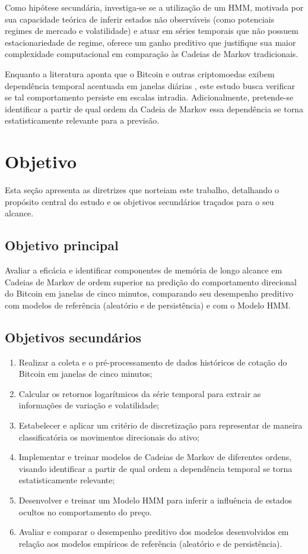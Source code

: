 \documentclass[
    12pt,                %
    openright,           %
    oneside,             %
    a4paper,             %
    english,             %
    brazil               %
]{abntex2}
\begin{document}
Como hipótese secundária, investiga-se se a utilização de um HMM, motivada por sua capacidade 
teórica de inferir estados não observáveis (como potenciais regimes de mercado e volatilidade) e atuar
em séries temporais que não possuem estacionariedade de regime,
oferece um ganho preditivo que justifique sua maior complexidade computacional em comparação às 
Cadeias de Markov tradicionais.

Enquanto a literatura aponta que o Bitcoin e outras criptomoedas exibem dependência
temporal acentuada em janelas diárias \cite{NASCIMENTO}, este estudo busca
verificar se tal comportamento persiste em escalas intradia. Adicionalmente, 
pretende-se identificar a partir de qual ordem da Cadeia de Markov essa dependência 
se torna estatisticamente relevante para a previsão.

\section{Objetivo}
\label{sec:objetivo}
Esta seção apresenta as diretrizes que norteiam este trabalho, detalhando o propósito central do estudo e os objetivos secundários traçados para o seu alcance.

\subsection{Objetivo principal}

Avaliar a eficácia e identificar componentes de memória de longo alcance em Cadeias de Markov de ordem superior na predição do comportamento direcional do Bitcoin em janelas de cinco minutos, comparando seu desempenho preditivo com modelos de referência (aleatório e de persistência) e com o Modelo HMM.

\subsection{Objetivos secundários}

\begin{enumerate}
    \item Realizar a coleta e o pré-processamento de dados históricos de cotação do Bitcoin em janelas de cinco minutos;
    \item Calcular os retornos logarítmicos da série temporal para extrair as informações de variação e volatilidade;
    \item Estabelecer e aplicar um critério de discretização para representar de maneira classificatória os movimentos direcionais do ativo;
    \item Implementar e treinar modelos de Cadeias de Markov de diferentes ordens, visando identificar a partir de qual ordem a dependência temporal se torna estatisticamente relevante;
    \item Desenvolver e treinar um Modelo HMM para inferir a influência de estados ocultos no comportamento do preço.
    \item Avaliar e comparar o desempenho preditivo dos modelos desenvolvidos em relação aos modelos empíricos de referência (aleatório e de persistência).
\end{enumerate}
\end{document}
